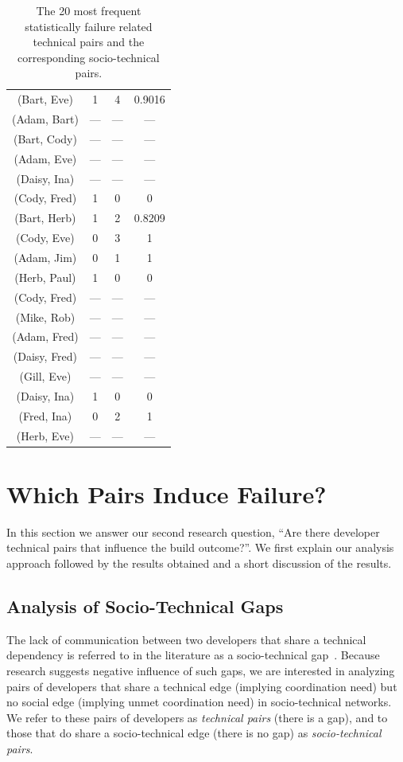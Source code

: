\begin{table}[t]
{\begin{tabular}{@{\hspace{.2cm}}ccc@{\hspace{.75cm}}c@{\hspace{.2cm}}}
(Bart, Eve)	&	1&	4&	0.9016\\
(Adam, Bart)	&	---&	---&	---\\
(Bart, Cody)	&	---&	---&	---\\
(Adam, Eve)	&	---&	---&	---\\
(Daisy, Ina)	&	---&	---&	---\\
(Cody, Fred)	&	1&	0&	0\\
(Bart, Herb)	&	1&	2&	0.8209\\
(Cody, Eve)	&	0&	3&	1\\
(Adam, Jim)	&	0&	1&	1\\
(Herb, Paul)	&	1&	0&	0\\
(Cody, Fred)	&	---&	---&	---\\
(Mike, Rob)	&	---&	---&	---\\
(Adam, Fred)	&	---&	---&	---\\
(Daisy, Fred)	&	---&	---&	---\\
(Gill, Eve)		&	---&	---&	---\\
(Daisy, Ina)	&	1&	0&	0\\
(Fred, Ina)	&	0&	2&	1\\
(Herb, Eve)	&	---&	---&	---\\
\bottomrule
\end{tabular}
\label{tab:stechpairs}
}
\caption{The 20 most frequent statistically failure related technical pairs and the corresponding socio-technical pairs.}
\label{tab:pairs}
\end{table}
\addtocounter{table}{-1}




\section{Which Pairs Induce Failure?}
\label{sec:pattern}
In this section we answer our second research question, ``Are there
developer technical pairs that influence the build outcome?''. 
We first explain our analysis approach followed by the results obtained and a
short discussion of the results.

\subsection{Analysis of Socio-Technical Gaps}
The lack of communication between two developers that share a
technical dependency is referred to in the literature as a
socio-technical gap~\cite{valetto:msr:2007}. Because research suggests negative influence of such gaps, we are interested in analyzing pairs of developers that share a technical edge (implying coordination need) but no social edge (implying
unmet coordination need) in socio-technical networks. We refer to these pairs of
developers as \emph{technical pairs} (there is a gap), and to those that do
share a socio-technical edge (there is no gap) as \emph{socio-technical pairs}. 

